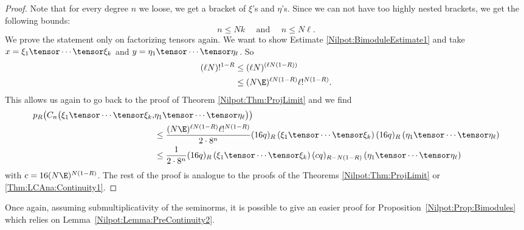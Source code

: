 \begin{proof}
	Note that for every degree $n$ we loose, we get a bracket of $\xi$'s and 
	$\eta$'s. Since we can not have too highly nested brackets, we get the 
	following bounds:
	\begin{equation*}
		n
		\leq
		N k
		\quad \text{ and } \quad
		n 
		\leq 
		N \ell.
	\end{equation*}
	We prove the statement only on factorizing tensors again. We 
	want to show Estimate \eqref{Nilpot:BimoduleEstimate1} and take
	$x = \xi_1 \tensor \cdots \tensor \xi_k$ and $y = \eta_1 \tensor \cdots 
	\tensor \eta_\ell$. So
	\begin{align*}
		(\ell N)!^{1-R}
		& \leq
		(\ell N)^{(\ell N (1-R))}
		\\
		& \leq
		(N \E)^{\ell N (1- R)}
		\ell!^{N(1-R)}.
	\end{align*}
	This allows us again to go back to the proof of Theorem 
	\ref{Nilpot:Thm:ProjLimit} and we find
	\begin{align*}
		p_R \big(
			C_n \big(
				\xi_1 \tensor \cdots \tensor \xi_k,
		&
				\eta_1 \tensor \cdots \tensor \eta_\ell
			\big)
		\big)
		\\
		& \leq 
		\frac{ (N \E)^{\ell N (1- R)} \ell!^{N(1-R)} }
		{2 \cdot 8^n}
		(16 q)_R
		\left(
			\xi_1 \tensor \cdots \tensor \xi_k
		\right)
		(16 q)_R
		\left(
			\eta_1 \tensor \cdots \tensor \eta_\ell
		\right)
		\\
		& \leq
		\frac{1}{2 \cdot 8^n}
		(16 q)_R
		\left(
			\xi_1 \tensor \cdots \tensor \xi_k
		\right)
		(c q)_{R - N(1-R)}
		\left(
			\eta_1 \tensor \cdots \tensor \eta_\ell
		\right)
	\end{align*}
	with $c = 16 (N \E)^{N (1- R)}$. The rest of the proof is analogue to the 
	proofs of the Theorems \ref{Nilpot:Thm:ProjLimit} or
	 \ref{Thm:LCAna:Continuity1}.
\end{proof}
Once again, assuming submultiplicativity of the seminorms, it is possible to give 
an easier proof for Proposition~\ref{Nilpot:Prop:Bimodules} which relies on 
Lemma~\ref{Nilpot:Lemma:PreContinuity2}.
